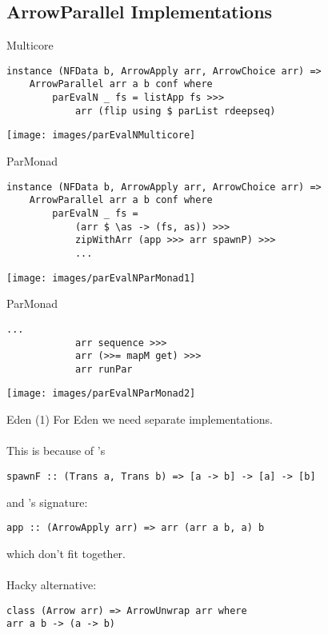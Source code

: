 \subsection{ArrowParallel Implementations}
\begin{frame}[fragile]{Multicore}
\begin{lstlisting}[frame=htrbl]
instance (NFData b, ArrowApply arr, ArrowChoice arr) =>
	ArrowParallel arr a b conf where
		parEvalN _ fs = listApp fs >>>
			arr (flip using $ parList rdeepseq)
\end{lstlisting}
\begin{center}
\texttt{[image: images/parEvalNMulticore]}
\end{center}
\end{frame}

\begin{frame}[fragile]{ParMonad}
\begin{lstlisting}[frame=htrbl]
instance (NFData b, ArrowApply arr, ArrowChoice arr) =>
	ArrowParallel arr a b conf where
		parEvalN _ fs = 
			(arr $ \as -> (fs, as)) >>>
			zipWithArr (app >>> arr spawnP) >>>
			...
\end{lstlisting}
\begin{center}
\texttt{[image: images/parEvalNParMonad1]}
\end{center}
\end{frame}

\begin{frame}[fragile]{ParMonad}
\begin{lstlisting}[frame=htrbl]
			...
			arr sequence >>>
			arr (>>= mapM get) >>>
			arr runPar
\end{lstlisting}
\begin{center}
\texttt{[image: images/parEvalNParMonad2]}
\end{center}
\end{frame}


\begin{frame}[fragile]{Eden (1)}
For Eden we need separate implementations.\\~\\
This is because of 's
\begin{lstlisting}[frame=htrbl]
spawnF :: (Trans a, Trans b) => [a -> b] -> [a] -> [b]
\end{lstlisting}
and 's signature:
\begin{lstlisting}[frame=htrbl]
app :: (ArrowApply arr) => arr (arr a b, a) b
\end{lstlisting}
which don't fit together.\\~\\
\pause
Hacky alternative:
\begin{lstlisting}[frame=htrbl]
class (Arrow arr) => ArrowUnwrap arr where
arr a b -> (a -> b)
\end{lstlisting}
\end{frame}

